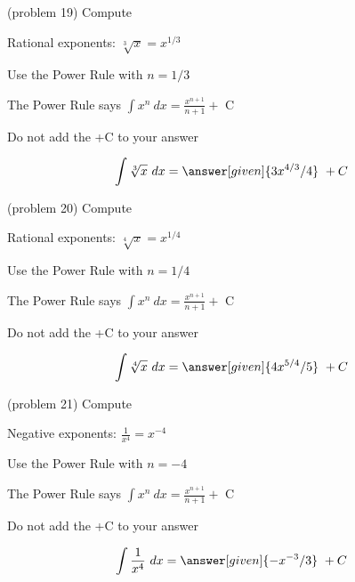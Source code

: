 \documentclass{ximera}
\begin{document}
\begin{problem}(problem 19)
Compute 

\begin{hint}
Rational exponents: $\sqrt[3]x = x^{1/3}$
\end{hint}
\begin{hint}
Use the Power Rule with $n=1/3$
\end{hint}
\begin{hint}
The Power Rule says $\int x^n \ dx = \frac{x^{n+1}}{n+1} +$ C
\end{hint}
\begin{hint}
\begin{center}
Do not add the +C to your answer
\end{center}
\end{hint}

\[
\int \sqrt[3]x \ dx =
\answer[given]{3x^{4/3} /4} \ + C
\]
\end{problem}


\begin{problem}(problem 20)
Compute 

\begin{hint}
Rational exponents: $\sqrt[4]x = x^{1/4}$
\end{hint}
\begin{hint}
Use the Power Rule with $n=1/4$
\end{hint}
\begin{hint}
The Power Rule says $\int x^n \ dx = \frac{x^{n+1}}{n+1} +$ C
\end{hint}
\begin{hint}
\begin{center}
Do not add the +C to your answer
\end{center}
\end{hint}

\[
\int \sqrt[4]x \ dx =
\answer[given]{4x^{5/4} /5} \ + C
\]
\end{problem}




\begin{problem}(problem 21)
Compute 

\begin{hint}
Negative exponents: $\frac{1}{x^4} = x^{-4}$
\end{hint}
\begin{hint}
Use the Power Rule with $n=-4$
\end{hint}
\begin{hint}
The Power Rule says $\int x^n \ dx = \frac{x^{n+1}}{n+1} +$ C
\end{hint}
\begin{hint}
\begin{center}
Do not add the +C to your answer
\end{center}
\end{hint}

\[
\int \frac{1}{x^4} \ dx =
\answer[given]{-x^{-3} /3} \ + C
\]
\end{problem}
\end{document}
